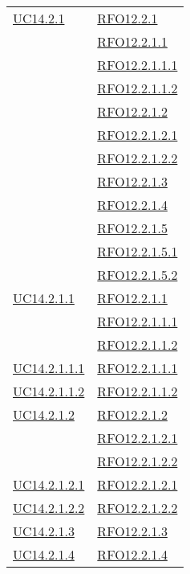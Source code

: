 \begin{longtable}{|>{\centering}m{5cm}|m{5cm}<{\centering}|}
\hyperlink{UC14.2.1}{UC14.2.1} 
& \hyperlink{RFO12.2.1}{RFO12.2.1}\\
& \hyperlink{RFO12.2.1.1}{RFO12.2.1.1}\\
& \hyperlink{RFO12.2.1.1.1}{RFO12.2.1.1.1}\\
& \hyperlink{RFO12.2.1.1.2}{RFO12.2.1.1.2}\\
& \hyperlink{RFO12.2.1.2}{RFO12.2.1.2}\\
& \hyperlink{RFO12.2.1.2.1}{RFO12.2.1.2.1}\\
& \hyperlink{RFO12.2.1.2.2}{RFO12.2.1.2.2}\\
& \hyperlink{RFO12.2.1.3}{RFO12.2.1.3}\\
& \hyperlink{RFO12.2.1.4}{RFO12.2.1.4}\\
& \hyperlink{RFO12.2.1.5}{RFO12.2.1.5}\\
& \hyperlink{RFO12.2.1.5.1}{RFO12.2.1.5.1}\\
& \hyperlink{RFO12.2.1.5.2}{RFO12.2.1.5.2}\\\hline

\hyperlink{UC14.2.1.1}{UC14.2.1.1} 
& \hyperlink{RFO12.2.1.1}{RFO12.2.1.1}\\
& \hyperlink{RFO12.2.1.1.1}{RFO12.2.1.1.1}\\
& \hyperlink{RFO12.2.1.1.2}{RFO12.2.1.1.2}\\\hline

\hyperlink{UC14.2.1.1.1}{UC14.2.1.1.1} & \hyperlink{RFO12.2.1.1.1}{RFO12.2.1.1.1}\\\hline
\hyperlink{UC14.2.1.1.2}{UC14.2.1.1.2} & \hyperlink{RFO12.2.1.1.2}{RFO12.2.1.1.2}\\\hline

\hyperlink{UC14.2.1.2}{UC14.2.1.2}
& \hyperlink{RFO12.2.1.2}{RFO12.2.1.2}\\
& \hyperlink{RFO12.2.1.2.1}{RFO12.2.1.2.1}\\
& \hyperlink{RFO12.2.1.2.2}{RFO12.2.1.2.2}\\\hline

\hyperlink{UC14.2.1.2.1}{UC14.2.1.2.1} & \hyperlink{RFO12.2.1.2.1}{RFO12.2.1.2.1}\\\hline
\hyperlink{UC14.2.1.2.2}{UC14.2.1.2.2} & \hyperlink{RFO12.2.1.2.2}{RFO12.2.1.2.2}\\\hline

\hyperlink{UC14.2.1.3}{UC14.2.1.3} & \hyperlink{RFO12.2.1.3}{RFO12.2.1.3}\\\hline
\hyperlink{UC14.2.1.4}{UC14.2.1.4} & \hyperlink{RFO12.2.1.4}{RFO12.2.1.4}\\\hline


\end{longtable}
